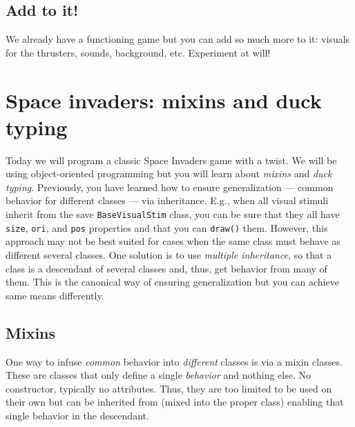 \documentclass[
]{book}
\begin{document}
\hypertarget{add-to-it}{%
\section{Add to it!}\label{add-to-it}}

We already have a functioning game but you can add so much more to it: visuals for the thrusters, sounds, background, etc. Experiment at will!

\hypertarget{seminar-02-05}{%
\chapter{Space invaders: mixins and duck typing}\label{seminar-02-05}}

Today we will program a classic Space Invaders game with a twist. We will be using object-oriented programming but you will learn about \emph{mixins} and \emph{duck typing}. Previously, you have learned how to ensure generalization --- common behavior for different classes --- via inheritance. E.g., when all visual stimuli inherit from the save \texttt{BaseVisualStim} class, you can be sure that they all have \texttt{size}, \texttt{ori}, and \texttt{pos} properties and that you can \texttt{draw()} them. However, this approach may not be best suited for cases when the same class must behave as different several classes. One solution is to use \emph{multiple inheritance}, so that a class is a descendant of several classes and, thus, get behavior from many of them. This is the canonical way of ensuring generalization but you can achieve same means differently.

\hypertarget{mixins}{%
\section{Mixins}\label{mixins}}

One way to infuse \emph{common} behavior into \emph{different} classes is via a mixin classes. These are classes that only define a single \emph{behavior} and nothing else. No constructor, typically no attributes. Thus, they are too limited to be used on their own but can be inherited from (mixed into the proper class) enabling that single behavior in the descendant.
\end{document}
